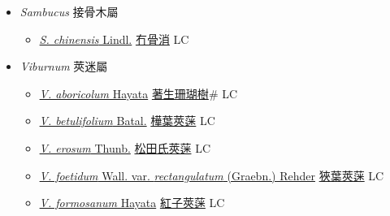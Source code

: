 
  \begin{itemize}
 \item[] \textit{Sambucus} 接骨木屬
                    
  \begin{itemize}
        \item[] \href{http://www.theplantlist.org/tpl1.1/search?q=Sambucus+chinensis}{\textit{S. chinensis} Lindl.}   \href{\detokenize{http://taibnet.sinica.edu.tw/chi/taibnet_species_list.php?T2=冇骨消&T2_new_value=true&fr=y}}{冇骨消} LC
  \end{itemize}
 \item[] \textit{Viburnum} 莢迷屬
                    
  \begin{itemize}
        \item[] \href{http://www.theplantlist.org/tpl1.1/search?q=Viburnum+aboricolum}{\textit{V. aboricolum} Hayata}   \href{\detokenize{http://taibnet.sinica.edu.tw/chi/taibnet_species_list.php?T2=著生珊瑚樹&T2_new_value=true&fr=y}}{著生珊瑚樹}\# LC
        \item[] \href{http://www.theplantlist.org/tpl1.1/search?q=Viburnum+betulifolium}{\textit{V. betulifolium} Batal.}   \href{\detokenize{http://taibnet.sinica.edu.tw/chi/taibnet_species_list.php?T2=樺葉莢蒾&T2_new_value=true&fr=y}}{樺葉莢蒾} LC
        \item[] \href{http://www.theplantlist.org/tpl1.1/search?q=Viburnum+erosum}{\textit{V. erosum} Thunb.}   \href{\detokenize{http://taibnet.sinica.edu.tw/chi/taibnet_species_list.php?T2=松田氏莢蒾&T2_new_value=true&fr=y}}{松田氏莢蒾} LC
        \item[] \href{http://www.theplantlist.org/tpl1.1/search?q=Viburnum+foetidum+var.+rectangulatum}{\textit{V. foetidum} Wall. var. \textit{rectangulatum} (Graebn.) Rehder}   \href{\detokenize{http://taibnet.sinica.edu.tw/chi/taibnet_species_list.php?T2=狹葉莢蒾&T2_new_value=true&fr=y}}{狹葉莢蒾} LC
        \item[] \href{http://www.theplantlist.org/tpl1.1/search?q=Viburnum+formosanum}{\textit{V. formosanum} Hayata}   \href{\detokenize{http://taibnet.sinica.edu.tw/chi/taibnet_species_list.php?T2=紅子莢蒾&T2_new_value=true&fr=y}}{紅子莢蒾} LC

\end{itemize}
\end{itemize}
